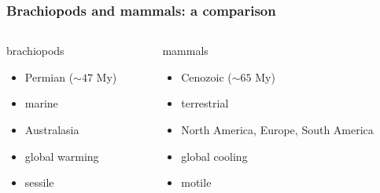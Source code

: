 \documentclass{beamer} \usepackage{amsmath,amsthm}
\begin{document}
\begin{frame}
  \frametitle{Brachiopods and mammals: a comparison}

  \begin{columns}
    \begin{column}{0.5\textwidth}
      \begin{block}{brachiopods}
        \begin{itemize}
          \item Permian (\(\sim 47\) My)
          \item marine
          \item Australasia
          \item global warming
          \item sessile
        \end{itemize}
      \end{block}
    \end{column}
    \begin{column}{0.5\textwidth}
      \begin{block}{mammals}
        \begin{itemize}
          \item Cenozoic (\(\sim 65\) My)
          \item terrestrial
          \item North America, Europe, South America
          \item global cooling
          \item motile
        \end{itemize}
      \end{block}
    \end{column}
  \end{columns}
\end{frame}
\end{document}
